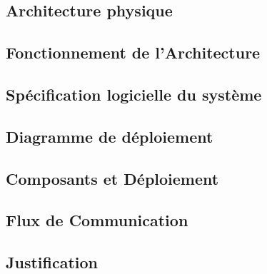 \subsection{Architecture physique}

\subsection{Fonctionnement de l’Architecture}

\subsection{Spécification logicielle du système}

\subsection{Diagramme de déploiement}


\subsection{Composants et Déploiement}


\subsection{Flux de Communication}


\subsection{Justification}
